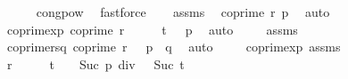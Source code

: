 \begin{isabellebody}
\ \ \ \ \isamarkupfalse%
\ cong{\isacharunderscore}{\kern0pt}pow\ \isamarkupfalse%
\ fastforce\isanewline
\isanewline
\ \ \isamarkupfalse%
\ assms{\isacharparenleft}{\kern0pt}{}{\isacharparenright}{\kern0pt}\ \isamarkupfalse%
\ {\isachardoublequoteopen}coprime\ r\ p{\isachardoublequoteclose}\ \isamarkupfalse%
\ auto\isanewline
\ \ \isamarkupfalse%
\ \isamarkupfalse%
\ coprime{\isacharunderscore}{\kern0pt}xp{\isacharcolon}{\kern0pt}\ {\isachardoublequoteopen}coprime\ {\isacharparenleft}{\kern0pt}{\isacharparenleft}{\kern0pt}r\ {\isacharcircum}{\kern0pt}\ {}{\isacharparenright}{\kern0pt}\ {\isacharcircum}{\kern0pt}\ {\isacharparenleft}{\kern0pt}{}\ {\isacharcircum}{\kern0pt}\ {\isacharparenleft}{\kern0pt}t\ {\isacharplus}{\kern0pt}\ {}{\isacharparenright}{\kern0pt}{\isacharparenright}{\kern0pt}{\isacharparenright}{\kern0pt}\ p{\isachardoublequoteclose}\ \isamarkupfalse%
\ auto\ \isanewline
\ \ \isamarkupfalse%
\ assms{\isacharparenleft}{\kern0pt}{}{\isacharparenright}{\kern0pt}\ \isamarkupfalse%
\ coprime{\isacharunderscore}{\kern0pt}r{\isacharunderscore}{\kern0pt}sq{\isacharcolon}{\kern0pt}\ {\isachardoublequoteopen}coprime\ {\isacharparenleft}{\kern0pt}r\ {\isacharcircum}{\kern0pt}\ {}{\isacharparenright}{\kern0pt}\ {\isacharparenleft}{\kern0pt}p\ {\isacharasterisk}{\kern0pt}\ q{\isacharparenright}{\kern0pt}{\isachardoublequoteclose}\ \isamarkupfalse%
\ auto\ \isanewline
\isanewline
\ \ \isamarkupfalse%
\ coprime{\isacharunderscore}{\kern0pt}xp\ assms{\isacharparenleft}{\kern0pt}{}{\isacharparenright}{\kern0pt}\ \isanewline
\ \ \isamarkupfalse%
\ {\isachardoublequoteopen}{\isacharbrackleft}{\kern0pt}{\isacharparenleft}{\kern0pt}{\isacharparenleft}{\kern0pt}r\ {\isacharcircum}{\kern0pt}\ {}{\isacharparenright}{\kern0pt}\ {\isacharcircum}{\kern0pt}\ {\isacharparenleft}{\kern0pt}{}\ {\isacharcircum}{\kern0pt}\ {\isacharparenleft}{\kern0pt}t\ {\isacharplus}{\kern0pt}\ {}{\isacharparenright}{\kern0pt}{\isacharparenright}{\kern0pt}{\isacharparenright}{\kern0pt}\ {\isacharcircum}{\kern0pt}\ {\isacharparenleft}{\kern0pt}{\isacharparenleft}{\kern0pt}{\isacharparenleft}{\kern0pt}Suc\ p{\isacharparenright}{\kern0pt}\ div\ {}{\isacharparenright}{\kern0pt}\ {\isacharcircum}{\kern0pt}\ {\isacharparenleft}{\kern0pt}Suc\ t{\isacharparenright}{\kern0pt}{\isacharparenright}{\kern0pt}\ \isanewline

\end{isabellebody}
